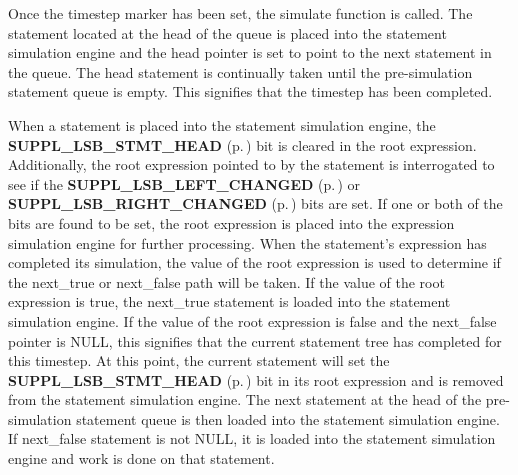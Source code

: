 Once the timestep marker has been set, the simulate function is called. The  statement located at the head of the queue is placed into the statement simulation  engine and the head pointer is set to point to the next statement in the queue.  The head statement is continually taken until the pre-simulation statement queue  is empty. This signifies that the timestep has been completed.

 When a statement is placed into the statement simulation engine, the {\bf SUPPL\_\-LSB\_\-STMT\_\-HEAD} {\rm (p.\,\pageref{group__expr__suppl_a4})}  bit is cleared in the root expression. Additionally, the root expression pointed to by  the statement is interrogated to see if the {\bf SUPPL\_\-LSB\_\-LEFT\_\-CHANGED} {\rm (p.\,\pageref{group__expr__suppl_a9})} or {\bf SUPPL\_\-LSB\_\-RIGHT\_\-CHANGED} {\rm (p.\,\pageref{group__expr__suppl_a10})}  bits are set. If one or both of the bits are found to be set, the root expression  is placed into the expression simulation engine for further processing. When the  statement's expression has completed its simulation, the value of the root expression  is used to determine if the next\_\-true or next\_\-false path will be taken. If the value  of the root expression is true, the next\_\-true statement is loaded into the statement  simulation engine. If the value of the root expression is false and the next\_\-false  pointer is NULL, this signifies that the current statement tree has completed for this  timestep. At this point, the current statement will set the {\bf SUPPL\_\-LSB\_\-STMT\_\-HEAD} {\rm (p.\,\pageref{group__expr__suppl_a4})} bit in  its root expression and is removed from the statement simulation engine. The next statement  at the head of the pre-simulation statement queue is then loaded into the statement  simulation engine. If next\_\-false statement is not NULL, it is loaded into the statement  simulation engine and work is done on that statement.

